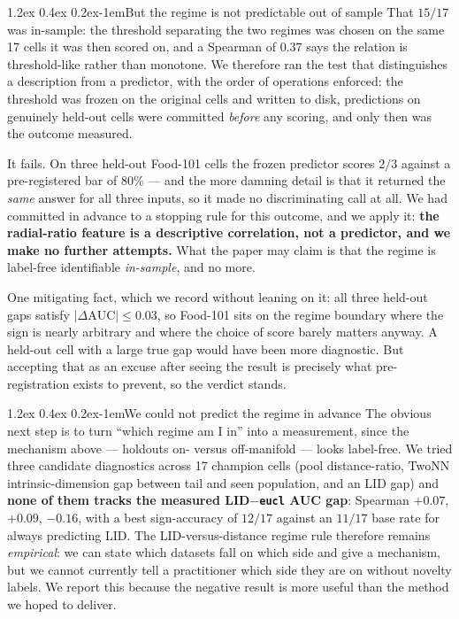 \documentclass{article}
\makeatletter
\renewcommand\paragraph{\@startsection{paragraph}{4}{\z@}%
  {1.2ex \@plus 0.4ex \@minus 0.2ex}{-1em}{\normalsize\bf}}
\newcommand{\auc}{\mathrm{AUC}}
\makeatother
\begin{document}
\paragraph{But the regime is not predictable out of sample}
That $15/17$ was in-sample: the threshold separating the two regimes was chosen
on the same 17 cells it was then scored on, and a Spearman of $0.37$ says the
relation is threshold-like rather than monotone. We therefore ran the test that
distinguishes a description from a predictor, with the order of operations
enforced: the threshold was frozen on the original cells and written to disk,
predictions on genuinely held-out cells were committed \emph{before} any
scoring, and only then was the outcome measured.

It fails. On three held-out Food-101 cells the frozen predictor scores $2/3$
against a pre-registered bar of $80\%$ --- and the more damning detail is that
it returned the \emph{same} answer for all three inputs, so it made no
discriminating call at all. We had committed in advance to a stopping rule for
this outcome, and we apply it: \textbf{the radial-ratio feature is a
descriptive correlation, not a predictor, and we make no further attempts.}
What the paper may claim is that the regime is label-free identifiable
\emph{in-sample}, and no more.

One mitigating fact, which we record without leaning on it: all three held-out
gaps satisfy $|\Delta \auc| \le 0.03$, so Food-101 sits on the regime boundary
where the sign is nearly arbitrary and where the choice of score barely matters
anyway. A held-out cell with a large true gap would have been more diagnostic.
But accepting that as an excuse after seeing the result is precisely what
pre-registration exists to prevent, so the verdict stands.

\paragraph{We could not predict the regime in advance}
The obvious next step is to turn ``which regime am I in'' into a measurement,
since the mechanism above --- holdouts on- versus off-manifold --- looks
label-free. We tried three candidate diagnostics across 17 champion cells (pool
distance-ratio, TwoNN intrinsic-dimension gap between tail and seen population,
and an LID gap) and \textbf{none of them tracks the measured LID$-$\texttt{eucl}
AUC gap}: Spearman $+0.07$, $+0.09$, $-0.16$, with a best sign-accuracy of
$12/17$ against an $11/17$ base rate for always predicting LID. The
LID-versus-distance regime rule therefore remains \emph{empirical}: we can state
which datasets fall on which side and give a mechanism, but we cannot currently
tell a practitioner which side they are on without novelty labels. We report
this because the negative result is more useful than the method we hoped to
deliver.
\end{document}
